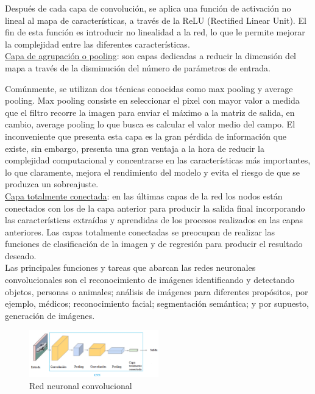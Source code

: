 Después de cada capa de convolución, se aplica una función de activación no lineal al mapa de características, a través de la ReLU (Rectified Linear Unit). El fin de esta función es introducir no linealidad a la red, lo que le permite mejorar la complejidad entre las diferentes características. \\

\underline{Capa de agrupación o pooling}: son capas dedicadas a reducir la dimensión del mapa a través de la disminución del número de parámetros de entrada.

Comúnmente, se utilizan dos técnicas conocidas como max pooling y average pooling. Max pooling consiste en seleccionar el pixel con mayor valor a medida que el filtro recorre la imagen para enviar el máximo a la matriz de salida, en cambio, average pooling lo que busca es calcular el valor medio del campo. El inconveniente que presenta esta capa es la gran pérdida de información que existe, sin embargo, presenta una gran ventaja a la hora de reducir la complejidad computacional y concentrarse en las características más importantes, lo que claramente, mejora el rendimiento del modelo y evita el riesgo de que se produzca un sobreajuste.\\

\underline{Capa totalmente conectada}: en las últimas capas de la red los nodos están conectados con los de la capa anterior para producir la salida final incorporando las características extraídas y aprendidas de los procesos realizados en las capas anteriores. Las capas totalmente conectadas se preocupan de realizar las funciones de clasificación de la imagen y de regresión para producir el resultado deseado. \\

Las principales funciones y tareas que abarcan las redes neuronales convolucionales son el reconocimiento de imágenes identificando y detectando objetos, personas o animales; análisis de imágenes para diferentes propósitos, por ejemplo, médicos; reconocimiento facial; segmentación semántica; y por supuesto, generación de imágenes.\\

\begin{figure}[h]
	\centering
	\includegraphics[width = 0.5\textwidth]{Imagenes/Vectorial/cnn.png}
	\caption{Red neuronal convolucional}
	\label{fig:cnn}
\end{figure}

